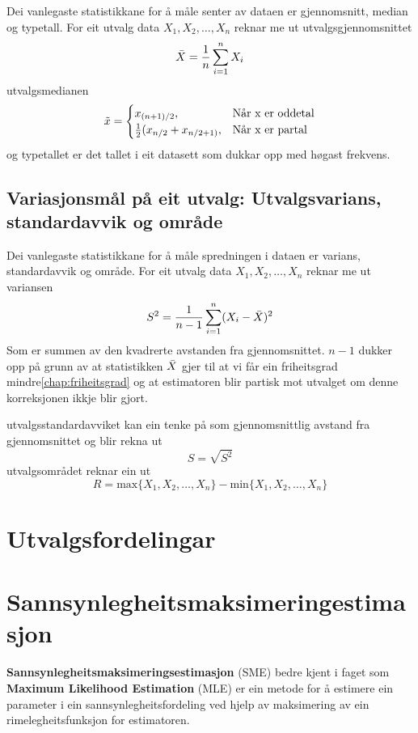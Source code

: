 Dei vanlegaste statistikkane for å måle senter av dataen er gjennomsnitt, median og typetall. For eit utvalg data $X_1, X_2, \dots, X_n$ reknar me ut utvalgsgjennomsnittet
\begin{equation}
    \Bar{X} = \frac{1}{n}\sum_{i=1}^n X_i
\end{equation}
utvalgsmedianen
\begin{equation}
    \Tilde{x} = 
    \begin{cases}
    x_{(n+1) / 2}, & \text{Når x er oddetal}  \\
    \frac{1}{2} (x_{n/2} + x_{n/2 + 1)}, & \text{Når x er partal}
    \end{cases}
\end{equation}
og typetallet er det tallet i eit datasett som dukkar opp med høgast frekvens.

\subsection{Variasjonsmål på eit utvalg: Utvalgsvarians, standardavvik og område}
Dei vanlegaste statistikkane for å måle spredningen i dataen er varians, standardavvik og område. For eit utvalg data $X_1, X_2, \dots, X_n$ reknar me ut variansen
\begin{equation}
    S^2 = \frac{1}{n - 1} \sum_{i = 1}^n (X_i - \Bar{X})^2
\end{equation}
Som er summen av den kvadrerte avstanden fra gjennomsnittet. $n - 1$ dukker opp på grunn av at statistikken $\Bar{X}$ gjer til at vi får ein friheitsgrad mindre\ref{chap:friheitsgrad} og at estimatoren blir partisk mot utvalget om denne korreksjonen ikkje blir gjort. 

utvalgsstandardavviket kan ein tenke på som gjennomsnittlig avstand fra gjennomsnittet og blir rekna ut 
\begin{equation}
    S = \sqrt{S^2}
\end{equation}
utvalgsområdet reknar ein ut 
\begin{equation}
    R = \text{max}\{X_1, X_2, \dots, X_n\} - \text{min}\{X_1, X_2, \dots, X_n\}
\end{equation}

\section{Utvalgsfordelingar}


\section{Sannsynlegheitsmaksimeringestimasjon}
\textbf{Sannsynlegheitsmaksimeringsestimasjon} (SME) bedre kjent i faget som \textbf{Maximum Likelihood Estimation} (MLE) er ein metode for å estimere ein parameter i ein sannsynlegheitsfordeling ved hjelp av maksimering av ein rimelegheitsfunksjon for estimatoren.

